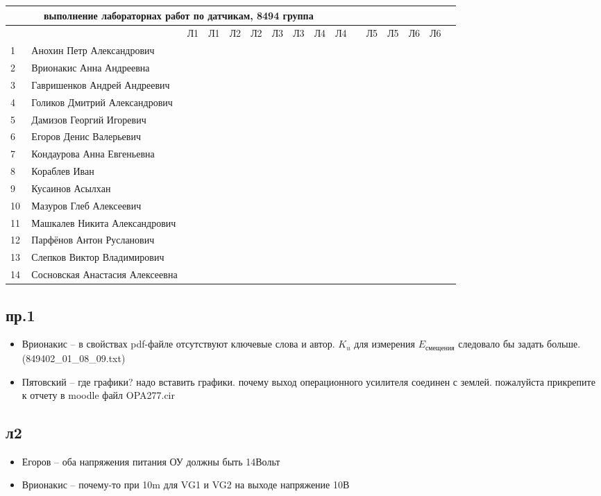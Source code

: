 \documentclass[a4paper,landscape,11pt]{article}
\begin{document}
\newpage
%
\begin{tabular}{l|llccccccccccccc}
\multicolumn{10}{c}{выполнение лабораторнах работ по датчикам, 8494 группа} \\
\toprule
&&Л1&Л1& Л2&Л2& Л3&Л3& Л4&Л4& &Л5&Л5& Л6&Л6\\
\midrule
1\,&   Анохин Петр Александрович       &&&&&&&&\\
2\,&   Врионакис Анна Андреевна        &&&&&&&&\\
3\,&   Гавришенков Андрей Андреевич    &&&&&&&&\\
4\,&   Голиков Дмитрий Александрович   &&&&&&&&\\
5\,&   Дамизов Георгий Игоревич        &&&&&&&&\\
\midrule
6\,&   Егоров Денис Валерьевич         &&&&&&&&\\
7\,&   Кондаурова Анна Евгеньевна      &&&&&&&&\\
8\,&   Кораблев Иван                   &&&&&&&&\\
9\,&   Кусаинов Асылхан                &&&&&&&&\\
10\,&  Мазуров Глеб Алексеевич         &&&&&&&&\\
\midrule
11\,&  Машкалев Никита Александрович   &&&&&&&&\\
12\,&  Парфёнов Антон Русланович       &&&&&&&&\\
13\,&  Слепков Виктор Владимирович     &&&&&&&&\\
14\,&  Сосновская Анастасия Алексеевна &&&&&&&&\\
\bottomrule
\end{tabular}

\subsection*{пр.1}
\begin{itemize}
	\item Врионакис -- в свойствах pdf-файле отсутствуют ключевые слова и автор. $K_u$ для измерения $E_\text{смещения}$ следовало бы задать больше. (849402\_01\_08\_09.txt)
	\item Пятовский --
		где графики? надо вставить графики.
почему выход операционного усилителя соединен с землей.
пожалуйста прикрепите к отчету в moodle файл   OPA277.cir
\end{itemize}

\subsection{л2}
\begin{itemize}
\item Егоров -- оба напряжения питания ОУ должны быть 14Вольт
\item Врионакис -- почему-то при 10m для VG1 и VG2 на выходе напряжение 10В
\end{itemize}
\end{document}
